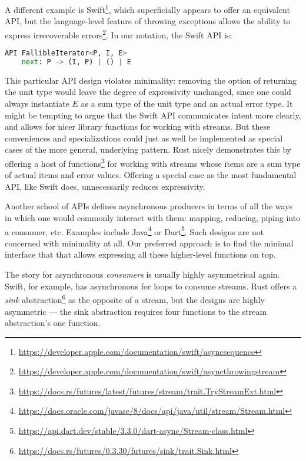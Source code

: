 \documentclass[sigplan,screen,10pt,anonymous,review]{acmart}
\begin{document}
A different example is Swift\footnote{\url{https://developer.apple.com/documentation/swift/asyncsequence}}, which superficially appears to offer an equivalent API, but the language-level feature of throwing exceptions allows the ability to express irrecoverable errors\footnote{\url{https://developer.apple.com/documentation/swift/asyncthrowingstream}}. In our notation, the Swift API is:

\begin{lstlisting}[language=Python]
API FallibleIterator<P, I, E>
    next: P -> (I, P) | () | E
\end{lstlisting}

This particular API design violates minimality: removing the option of returning the unit type would leave the degree of expressivity unchanged, since one could always instantiate $E$ as a sum type of the unit type and an actual error type. It might be tempting to argue that the Swift API communicates intent more clearly, and allows for nicer library functions for working with streams. But these conveniences and specializations could just as well be implemented as special cases of the more general, underlying pattern. Rust nicely demonstrates this by offering a host of functions\footnote{\url{https://docs.rs/futures/latest/futures/stream/trait.TryStreamExt.html}} for working with streams whose items are a sum type of actual items and error values. Offering a special case as the most fundamental API, like Swift does, unnecessarily reduces expressivity.

Another school of APIs defines asynchronous producers in terms of all the ways in which one would commonly interact with them: mapping, reducing, piping into a consumer, etc. Examples include Java\footnote{\url{https://docs.oracle.com/javase/8/docs/api/java/util/stream/Stream.html}} or Dart\footnote{\url{https://api.dart.dev/stable/3.3.0/dart-async/Stream-class.html}}. Such designs are not concerned with minimality at all. Our preferred approach is to find the minimal interface that that allows expressing all these higher-level functions on top.

The story for asynchronous \textit{consumers} is usually highly asymmetrical again. Swift, for example, has asynchronous for loops to consume streams. Rust offers a \textit{sink} abstraction\footnote{\url{https://docs.rs/futures/0.3.30/futures/sink/trait.Sink.html}} as the opposite of a stream, but the designs are highly asymmetric --- the sink abstraction requires four functions to the stream abstraction's one function.
\end{document}
